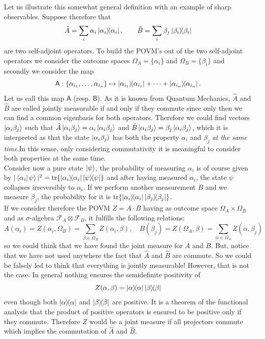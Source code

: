 \documentclass[10pt, a4paper]{amsart}
\begin{document}
Let us illustrate this somewhat general definition with an example of sharp observables. Suppose therefore that 
$$
\hat{A} = \sum_{i} \alpha_{i} \left| \alpha_{i}\right\rangle\!\!\left\langle \alpha_{i}\right|, \qquad \hat{B} = \sum_{i}\beta_{j}\left| \beta_{i}\right\rangle\!\!\left\langle \beta_{i}\right|
$$
are two self-adjoint operators. To build the POVM's out of the two self-adjoint operators we  consider the outcome spaces $\Omega_{A} = \{\alpha_{i}\}$ and $\Omega_{B} = \{\beta_{i}\}$ and secondly we consider the map 
$$\mathsf{A}:
\{\alpha_{i_{1}}, \ldots , \alpha_{i_{n}}\}\mapsto \left| \alpha_{i_{1}}\right\rangle\!\!\left\langle \alpha_{i_{1}}\right| + \cdots + \left| \alpha_{i_{n}}\right\rangle\!\!\left\langle \alpha_{i_{n}}\right|.
$$
 Let us call this map $\mathsf{A}$ (resp. $\mathsf{B}$). As it is known from Quantum Mechanics, $\hat{A}$ and $\hat{B}$ are called jointly measurable if and only if they commute since only then we can find a common eigenbasis for both operators. Therefore we could find vectors $\left| \alpha_{i} \beta_{j}\right\rangle$ such that $\hat{A}\left| \alpha_{i} \beta_{j}\right\rangle = \alpha_{i}\left| \alpha_{i}\beta_{j}\right\rangle$ and  $\hat{B}\left| \alpha_{i} \beta_{j}\right\rangle = \beta_{j}\left| \alpha_{i}\beta_{j}\right\rangle$, which it is interpreted as that the state $\left| \alpha_{i}\beta_{j}\right\rangle$ has both the property $\alpha_{i}$ and $\beta_{j}$ \textit{at the same time}.In this sense, only considering commutativity  it is meaningful to consider both properties at the same time.\\

Consider now a pure state $\left| \psi\right\rangle $, the probability of measuring $\alpha_{i}$ is of course given by $|\left \langle \alpha_{i} \right|\left.\! \psi\right\rangle|^{2} = \mathrm{tr}\{\left| \alpha_{i}\right\rangle\!\!\left\langle \alpha_{i}\right|\left| \psi\right\rangle\!\!\left\langle \psi\right|\}$ and after having measured $\alpha_{i}$, the state $\psi$ collapses irreversibly to $\alpha_{i}$. If we perform another measurement $B$ and we measure $\beta_{j}$, the probability for it is $\mathrm{tr}\{\left| \alpha_{i}\right\rangle\!\!\left\langle \alpha_{i}\right|\left| \beta_{j}\right\rangle\!\!\left\langle \beta_{j}\right| \}$.\\

If we consider therefore the POVM $Z = A\cdot B$ having as outcome space $\Omega_{A}\times\Omega_{B}$ and as $\sigma$-algebra $\mathcal{F}_{A}\otimes \mathcal{F}_{B}$, it fulfills the following relations:
$$
A(\alpha_{i} ) = Z(\alpha_{i}, \Omega_{B}) = \sum_{\beta \in \Omega_{B}}Z(\alpha_{i}, \beta), \quad B(\beta_{j})=Z(\Omega_{A},\beta) = \sum_{\alpha \in \Omega_{A}} Z(\alpha, \beta_{j})
$$
so we could think that we have found the joint measure for $A$ and $B$. But, notice that we have not used anywhere the fact that $\hat{A}$ and $\hat{B}$ are commute. So we could be falsely led to think that everything is jointly measurable! However, that is not the case. In general nothing ensures the semidefinite positivity of 
$$
Z(\alpha, \beta ) = \left| \alpha\right\rangle\!\!\left\langle \alpha\right| \left| \beta\right\rangle\!\!\left\langle \beta\right|
$$
even though both $\left| \alpha\right\rangle\!\!\left\langle \alpha\right|$ and $\left| \beta\right\rangle\!\!\left\langle \beta\right|$ are positive. It is a theorem of the functional analysis \cite{lysternik1968elemente} that the product of positive operators is ensured to be positive only if they commute. Therefore $Z$ would be a joint measure if all projectors commute which implies the commutation of $\hat{A}$ and $\hat{B}$. 
\end{document}
